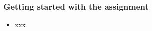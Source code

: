\documentclass[english,14pt]{beamer}
\begin{document}

\begin{frame}[fragile]

\frametitle{Getting started with the assignment}
\begin{itemize}
	\item xxx
\end{itemize}

\end{frame}
\end{document}
